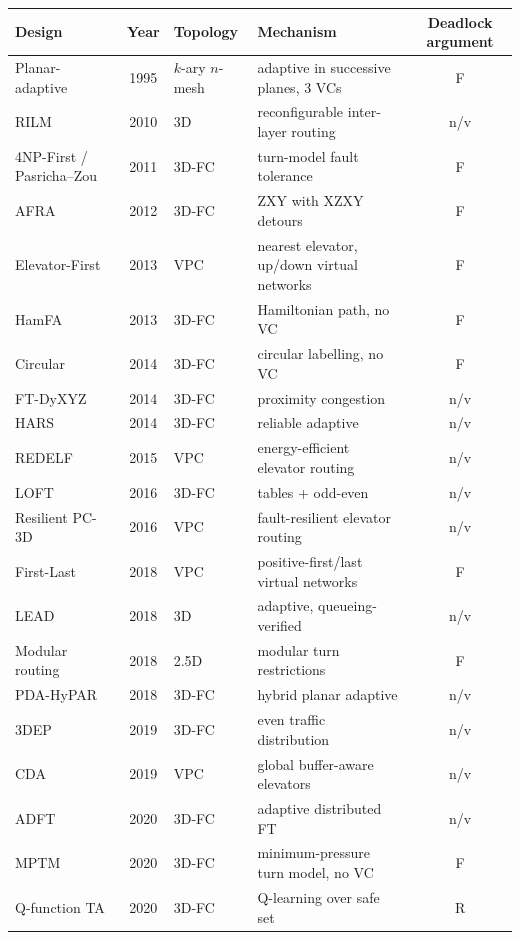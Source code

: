 \begin{tabularx}{\linewidth}{@{}>{\raggedright\arraybackslash}p{3.6cm}c>{\raggedright\arraybackslash}p{2.0cm}>{\raggedright\arraybackslash}X c@{}}
\toprule
Design & Year & Topology & Mechanism & Deadlock argument \\
\midrule
Planar-adaptive~\cite{chien1995planar} & 1995 & $k$-ary $n$-mesh & adaptive in successive planes, 3 VCs & F \\
RILM~\cite{rusu2010rilm} & 2010 & 3D & reconfigurable inter-layer routing & n/v \\
4NP-First / Pasricha--Zou~\cite{pasricha2011lowoverhead} & 2011 & 3D-FC & turn-model fault tolerance & F \\
AFRA~\cite{akbari2012afra} & 2012 & 3D-FC & ZXY with XZXY detours & F \\
Elevator-First~\cite{dubois2013elevator} & 2013 & VPC & nearest elevator, up/down virtual networks & F \\
HamFA~\cite{ebrahimi2013hamfa} & 2013 & 3D-FC & Hamiltonian path, no VC & F \\
Circular~\cite{alizadeh2014circular} & 2014 & 3D-FC & circular labelling, no VC & F \\
FT-DyXYZ~\cite{jouybari2014dyxyz} & 2014 & 3D-FC & proximity congestion & n/v \\
HARS~\cite{zhou2014hars} & 2014 & 3D-FC & reliable adaptive & n/v \\
REDELF~\cite{lee2015redelf} & 2015 & VPC & energy-efficient elevator routing & n/v \\
LOFT~\cite{zhou2016loft} & 2016 & 3D-FC & tables + odd-even & n/v \\
Resilient PC-3D~\cite{salamat2016resilient} & 2016 & VPC & fault-resilient elevator routing & n/v \\
First-Last~\cite{charif2018firstlast} & 2018 & VPC & positive-first/last virtual networks & F \\
LEAD~\cite{salamat2018lead} & 2018 & 3D & adaptive, queueing-verified & n/v \\
Modular routing~\cite{yin2018modular} & 2018 & 2.5D & modular turn restrictions & F \\
PDA-HyPAR~\cite{dai2018pdahypar} & 2018 & 3D-FC & hybrid planar adaptive & n/v \\
3DEP~\cite{vahdatpanah2019threedep} & 2019 & 3D-FC & even traffic distribution & n/v \\
CDA~\cite{fu2019cda} & 2019 & VPC & global buffer-aware elevators & n/v \\
ADFT~\cite{mogharrabi2020adft} & 2020 & 3D-FC & adaptive distributed FT & n/v \\
MPTM~\cite{cai2020mptm} & 2020 & 3D-FC & minimum-pressure turn model, no VC & F \\
Q-function TA~\cite{lee2020qthermal} & 2020 & 3D-FC & Q-learning over safe set & R \\
\bottomrule
\end{tabularx}
